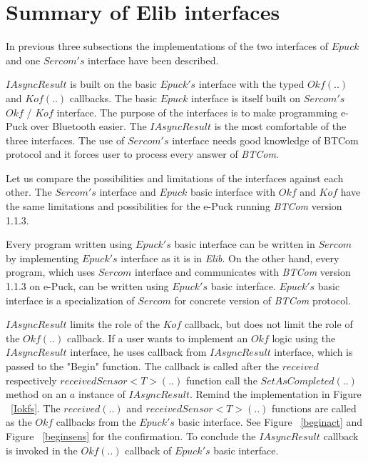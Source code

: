 \section{Summary of Elib interfaces}
\label{sec:suminterface}
  In previous three subsections the implementations of the two interfaces of $Epuck$ 
  and one $Sercom's$ interface have been described.

  $IAsyncResult$ is built on the basic $Epuck's$ interface with the typed $Okf(..)$ and $Kof(..)$ callbacks. 
  The basic $Epuck$ interface is itself built on $Sercom's$ $Okf$ / $Kof$ interface.
  The purpose of the interfaces is to make programming e-Puck over Bluetooth easier.
  The $IAsyncResult$ is the most comfortable of the three interfaces. 
  The use of $Sercom's$ interface needs good knowledge of BTCom protocol and 
  it forces user to process every answer of {\it BTCom}.

  Let us compare the possibilities and limitations of the interfaces against each other.
  The $Sercom's$ interface and $Epuck$ basic interface with $Okf$ and $Kof$ 
  have the same limitations and possibilities for the e-Puck running {\it BTCom} version 1.1.3. 
  
  Every program written using $Epuck's$ basic interface can be written
  in $Sercom$ by implementing $Epuck's$ interface as it is in {\it Elib}.
  On the other hand, every program, which uses $Sercom$ interface and communicates with {\it BTCom}
  version 1.1.3 on e-Puck, can be written using $Epuck's$ basic interface. 
  $Epuck's$ basic interface is a specialization of $Sercom$ for concrete version of {\it BTCom}
  protocol.

  $IAsyncResult$ limits the role of the $Kof$ callback, but does not limit the role of the $Okf(..)$ callback.
  If a user wants to implement an $Okf$ logic using the $IAsyncResult$ interface, he uses callback from $IAsyncResult$
  interface, which is passed to the "Begin" function.
  The callback is called after the $received$ respectively $receivedSensor<T>(..)$ function  call 
  the $SetAsCompleted(..)$ method on an $a$ instance of $IAsyncResult$. 
  Remind the implementation in Figure ~\ref{Iokfs}.
  The $received(..)$ and $receivedSensor<T>(..)$ functions are called as the $Okf$ callbacks
  from the $Epuck's$ basic interface.
  See Figure ~\ref{beginact} and Figure ~\ref{beginsens} for the confirmation.
  To conclude the $IAsyncResult$ callback is invoked in the $Okf(..)$ callback of $Epuck's$ basic interface.

